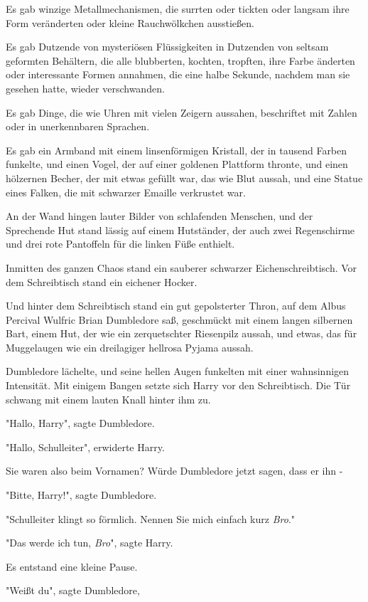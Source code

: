 {Es gab winzige Metallmechanismen, die surrten oder tickten oder langsam ihre Form veränderten oder kleine Rauchwölkchen ausstießen.

Es gab Dutzende von mysteriösen Flüssigkeiten in Dutzenden von seltsam geformten Behältern, die alle blubberten, kochten, tropften, ihre Farbe änderten oder interessante Formen annahmen, die eine halbe Sekunde, nachdem man sie gesehen hatte, wieder verschwanden.

Es gab Dinge, die wie Uhren mit vielen Zeigern aussahen, beschriftet mit Zahlen oder in unerkennbaren Sprachen.

Es gab ein Armband mit einem linsenförmigen Kristall, der in tausend Farben funkelte, und einen Vogel, der auf einer goldenen Plattform thronte, und einen hölzernen Becher, der mit etwas gefüllt war, das wie Blut aussah, und eine Statue eines Falken, die mit schwarzer Emaille verkrustet war.

An der Wand hingen lauter Bilder von schlafenden Menschen, und der Sprechende Hut stand lässig auf einem Hutständer, der auch zwei Regenschirme und drei rote Pantoffeln für die linken Füße enthielt.

Inmitten des ganzen Chaos stand ein sauberer schwarzer Eichenschreibtisch. Vor dem Schreibtisch stand ein eichener Hocker.

Und hinter dem Schreibtisch stand ein gut gepolsterter Thron, auf dem Albus Percival Wulfric Brian Dumbledore saß, geschmückt mit einem langen silbernen Bart, einem Hut, der wie ein zerquetschter Riesenpilz aussah, und etwas, das für Muggelaugen wie ein dreilagiger hellrosa Pyjama aussah.

Dumbledore lächelte, und seine hellen Augen funkelten mit einer wahnsinnigen Intensität. Mit einigem Bangen setzte sich Harry vor den Schreibtisch. Die Tür schwang mit einem lauten Knall hinter ihm zu.

"Hallo, Harry", sagte Dumbledore.

"Hallo, Schulleiter", erwiderte Harry.

Sie waren also beim Vornamen? Würde Dumbledore jetzt sagen, dass er ihn -

"Bitte, Harry!", sagte Dumbledore.

"Schulleiter klingt so förmlich. Nennen Sie mich einfach kurz \emph{Bro}."

"Das werde ich tun, \emph{Bro}", sagte Harry.

Es entstand eine kleine Pause.

"Weißt du", sagte Dumbledore,

}
